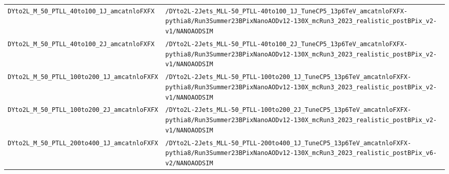 \begin{longtable}{@{}>{\RaggedRight\arraybackslash}p{} >{\RaggedRight\arraybackslash}p{}@{}}
\addlinespace[2pt]
\texttt{DYto2L\_\allowbreak{}M\_\allowbreak{}50\_\allowbreak{}PTLL\_\allowbreak{}40to100\_\allowbreak{}1J\_\allowbreak{}amcatnloFXFX} & \texttt{/\allowbreak{}DYto2L-\allowbreak{}2Jets\_\allowbreak{}MLL-\allowbreak{}50\_\allowbreak{}PTLL-\allowbreak{}40to100\_\allowbreak{}1J\_\allowbreak{}TuneCP5\_\allowbreak{}13p6TeV\_\allowbreak{}amcatnloFXFX-\allowbreak{}pythia8/\allowbreak{}Run3Summer23BPixNanoAODv12-\allowbreak{}130X\_\allowbreak{}mcRun3\_\allowbreak{}2023\_\allowbreak{}realistic\_\allowbreak{}postBPix\_\allowbreak{}v2-\allowbreak{}v1/\allowbreak{}NANOAODSIM} \\
\addlinespace[2pt]
\texttt{DYto2L\_\allowbreak{}M\_\allowbreak{}50\_\allowbreak{}PTLL\_\allowbreak{}40to100\_\allowbreak{}2J\_\allowbreak{}amcatnloFXFX} & \texttt{/\allowbreak{}DYto2L-\allowbreak{}2Jets\_\allowbreak{}MLL-\allowbreak{}50\_\allowbreak{}PTLL-\allowbreak{}40to100\_\allowbreak{}2J\_\allowbreak{}TuneCP5\_\allowbreak{}13p6TeV\_\allowbreak{}amcatnloFXFX-\allowbreak{}pythia8/\allowbreak{}Run3Summer23BPixNanoAODv12-\allowbreak{}130X\_\allowbreak{}mcRun3\_\allowbreak{}2023\_\allowbreak{}realistic\_\allowbreak{}postBPix\_\allowbreak{}v2-\allowbreak{}v1/\allowbreak{}NANOAODSIM} \\
\addlinespace[2pt]
\texttt{DYto2L\_\allowbreak{}M\_\allowbreak{}50\_\allowbreak{}PTLL\_\allowbreak{}100to200\_\allowbreak{}1J\_\allowbreak{}amcatnloFXFX} & \texttt{/\allowbreak{}DYto2L-\allowbreak{}2Jets\_\allowbreak{}MLL-\allowbreak{}50\_\allowbreak{}PTLL-\allowbreak{}100to200\_\allowbreak{}1J\_\allowbreak{}TuneCP5\_\allowbreak{}13p6TeV\_\allowbreak{}amcatnloFXFX-\allowbreak{}pythia8/\allowbreak{}Run3Summer23BPixNanoAODv12-\allowbreak{}130X\_\allowbreak{}mcRun3\_\allowbreak{}2023\_\allowbreak{}realistic\_\allowbreak{}postBPix\_\allowbreak{}v2-\allowbreak{}v1/\allowbreak{}NANOAODSIM} \\
\addlinespace[2pt]
\texttt{DYto2L\_\allowbreak{}M\_\allowbreak{}50\_\allowbreak{}PTLL\_\allowbreak{}100to200\_\allowbreak{}2J\_\allowbreak{}amcatnloFXFX} & \texttt{/\allowbreak{}DYto2L-\allowbreak{}2Jets\_\allowbreak{}MLL-\allowbreak{}50\_\allowbreak{}PTLL-\allowbreak{}100to200\_\allowbreak{}2J\_\allowbreak{}TuneCP5\_\allowbreak{}13p6TeV\_\allowbreak{}amcatnloFXFX-\allowbreak{}pythia8/\allowbreak{}Run3Summer23BPixNanoAODv12-\allowbreak{}130X\_\allowbreak{}mcRun3\_\allowbreak{}2023\_\allowbreak{}realistic\_\allowbreak{}postBPix\_\allowbreak{}v2-\allowbreak{}v1/\allowbreak{}NANOAODSIM} \\
\addlinespace[2pt]
\texttt{DYto2L\_\allowbreak{}M\_\allowbreak{}50\_\allowbreak{}PTLL\_\allowbreak{}200to400\_\allowbreak{}1J\_\allowbreak{}amcatnloFXFX} & \texttt{/\allowbreak{}DYto2L-\allowbreak{}2Jets\_\allowbreak{}MLL-\allowbreak{}50\_\allowbreak{}PTLL-\allowbreak{}200to400\_\allowbreak{}1J\_\allowbreak{}TuneCP5\_\allowbreak{}13p6TeV\_\allowbreak{}amcatnloFXFX-\allowbreak{}pythia8/\allowbreak{}Run3Summer23BPixNanoAODv12-\allowbreak{}130X\_\allowbreak{}mcRun3\_\allowbreak{}2023\_\allowbreak{}realistic\_\allowbreak{}postBPix\_\allowbreak{}v6-\allowbreak{}v2/\allowbreak{}NANOAODSIM} \\

\end{longtable}
